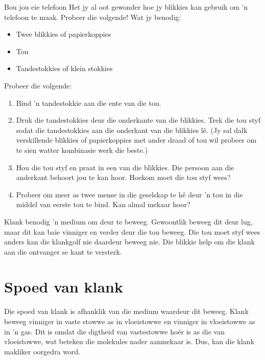 	\par


\begin{activity}{Bou jou eie telefoon} 
Het jy al oot gewonder hoe jy blikkies kan gebruik om 'n telefoon te maak. Probeer die volgende!
Wat jy benodig:
\begin{itemize}
 \item Twee blikkies of papierkoppies
  \item Tou
  \item Tandestokkies of klein stokkies
\end{itemize}

Probeer die volgende:
\begin{enumerate}[noitemsep, label=\textbf{\arabic*}. ] 
\item Bind 'n tandestokkie aan die ente van die tou. 
\item Druk die tandestokkies deur die onderkante van die blikkies. Trek die tou styf sodat die tandestokkies aan die onderkant van die blikkies l\^e. (Jy sal dalk verskillende blikkies of papierkoppies met ander draad of tou wil probeer om te sien watter kombinasie werk die beste.)
\item Hou die tou styf en praat in een van die blikkies. Die persoon aan die anderkant behoort jou te kan hoor. Hoekom moet die tou styf wees?
\item Probeer om meer as twee mense in die geselskap te h\^e deur 'n tou in die middel van eerste tou te bind. Kan almal mekaar hoor?
\end{enumerate}
Klank benodig 'n medium om deur te beweeg. Gewoontlik beweeg dit deur lug, maar dit kan baie vinniger en verder deur die tou beweeg. Die tou moet styf wees anders kan die klankgolf nie daardeur beweeg nie. Die blikkie help om die klank aan die ontvanger se kant te versterk.	
\end{activity}

    \label{m38799*cid3}
            \section{Spoed van klank}
            \nopagebreak
Die spoed van klank is afhanklik van die medium waardeur dit beweeg. Klank beweeg vinniger in vaste stowwe as in vloeistowwe en vinniger in vloeistowwe as in 'n gas. Dit is omdat die digtheid van vastestowwe ho\"{e}r is as die van vloeistowwe, wat beteken die molekules nader aanmekaar is. Dus, kan die klank makliker oorgedra word.\par 

